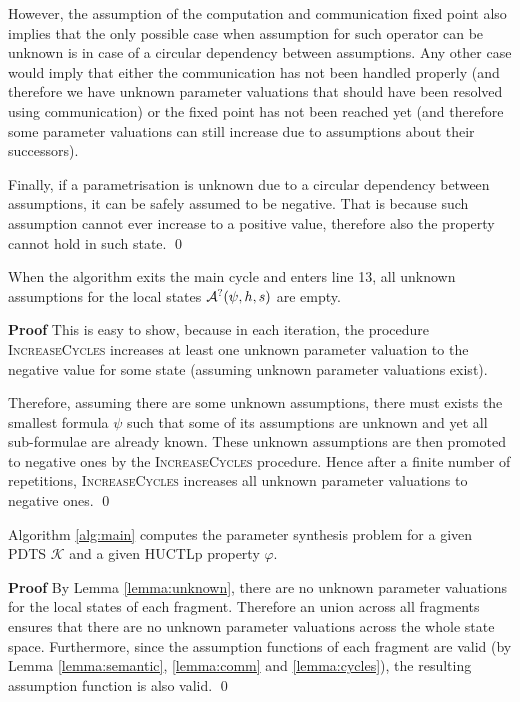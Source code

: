 
However, the assumption of the computation and communication fixed point also implies that the only possible case when assumption for such operator can be unknown is in case of a circular dependency between assumptions. Any other case would imply that either the communication has not been handled properly (and therefore we have unknown parameter valuations that should have been resolved using communication) or the fixed point has not been reached yet (and therefore some parameter valuations can still increase due to assumptions about their successors).

Finally, if a parametrisation is unknown due to a circular dependency between assumptions, it can be safely assumed to be negative. That is because such assumption cannot ever increase to a positive value, therefore also the property cannot hold in such state. \qed

\begin{lemma}
	\label{lemma:unknown}
	When the algorithm exits the main cycle and enters line 13, all unknown assumptions for the local states $\mathcal{A}^?(\psi, h, s)$ are empty.
\end{lemma}

\textbf{Proof} This is easy to show, because in each iteration, the procedure \textsc{IncreaseCycles} increases at least one unknown parameter valuation to the negative value for some state (assuming unknown parameter valuations exist). 

Therefore, assuming there are some unknown assumptions, there must exists the smallest formula $\psi$ such that some of its assumptions are unknown and yet all sub-formulae are already known. These unknown assumptions are then promoted to negative ones by the \textsc{IncreaseCycles} procedure. Hence after a finite number of repetitions, \textsc{IncreaseCycles} increases all unknown parameter valuations to negative ones. \qed

\begin{theorem}
	Algorithm \ref{alg:main} computes the parameter synthesis problem for a given \ac{PDTS} $\mathcal{K}$ and a given \ac{HUCTLp} property $\varphi$.
\end{theorem}

\textbf{Proof} By Lemma \ref{lemma:unknown}, there are no unknown parameter valuations for the local states of each fragment. Therefore an union across all fragments ensures that there are no unknown parameter valuations across the whole state space. Furthermore, since the assumption functions of each fragment are valid (by Lemma 	\ref{lemma:semantic}, \ref{lemma:comm} and \ref{lemma:cycles}), the resulting assumption function is also valid. \qed


